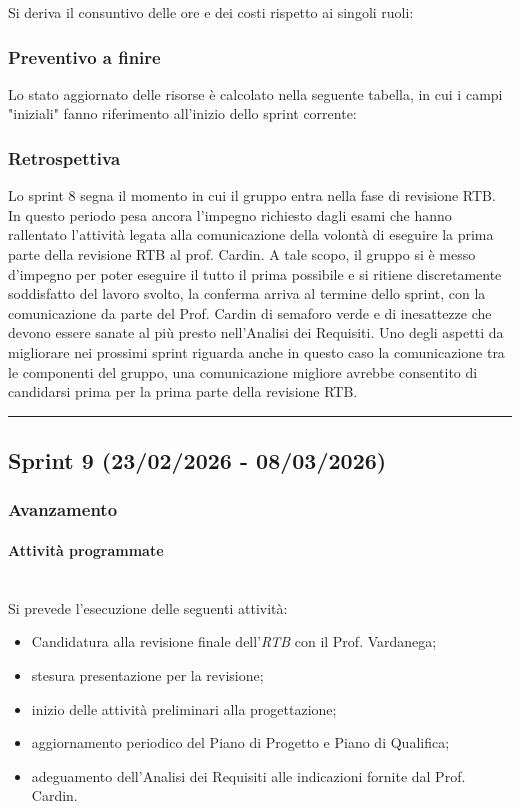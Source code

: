 \documentclass[10pt, letterpaper]{article}
\newcommand{\trisubsection}[1]{\paragraph{#1}\mbox{}\\}
\begin{document}
Si deriva il consuntivo delle ore e dei costi rispetto ai singoli ruoli:

\subsubsection{Preventivo a finire}
Lo stato aggiornato delle risorse è calcolato nella seguente tabella, in cui i campi "iniziali" fanno riferimento all'inizio dello sprint corrente:


\subsubsection{Retrospettiva}
Lo sprint 8 segna il momento in cui il gruppo entra nella fase di revisione RTB. In questo periodo pesa ancora l'impegno richiesto dagli esami
che hanno rallentato l'attività legata alla comunicazione della volontà di eseguire la prima parte della revisione RTB al prof. Cardin. A tale scopo,
il gruppo si è messo d'impegno per poter eseguire il tutto il prima possibile e si ritiene discretamente soddisfatto del lavoro svolto, la conferma
arriva al termine dello sprint, con la comunicazione da parte del Prof. Cardin di semaforo verde e di inesattezze che devono essere sanate al più presto
nell'Analisi dei Requisiti. Uno degli aspetti da migliorare nei prossimi sprint riguarda anche in questo caso la comunicazione tra le componenti del gruppo,
una comunicazione migliore avrebbe consentito di candidarsi prima per la prima parte della revisione RTB.


\vspace{1em}
\hrule
\vspace{1em}

\subsection{Sprint 9 (23/02/2026 - 08/03/2026)}
\subsubsection{Avanzamento}
\trisubsection{Attività programmate}
Si prevede l'esecuzione delle seguenti attività:
\begin{itemize}
    \item Candidatura alla revisione finale dell'\textit{RTB} con il Prof. Vardanega; 
    \item stesura presentazione per la revisione;
    \item inizio delle attività preliminari alla progettazione;
    \item aggiornamento periodico del Piano di Progetto e Piano di Qualifica;
    \item adeguamento dell'Analisi dei Requisiti alle indicazioni fornite dal Prof. Cardin.
\end{itemize}
\end{document}
